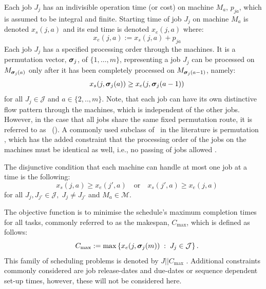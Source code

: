 \documentclass[twocolumn]{svjour3}
\begin{document}
Each job $J_j$ has an indivisible operation time (or cost) on machine $M_a$, 
$p_{ja}$, which is assumed to be integral and finite. 
Starting time of job $J_j$ on machine $M_a$ is denoted $x_s(j,a)$ and its 
end time is denoted $x_e(j,a)$ where:
\begin{equation}\quad x_e(j,a):=x_s(j,a)+p_{ja} \end{equation} 
Each job $J_j$ has a specified processing order through the machines. It is a 
permutation vector, $\bm \sigma_j$, of $\{1,\ldots,m\}$, representing a job $J_j$ 
can be processed on $M_{\bm \sigma_j(a)}$ only after it has been completely 
processed on $M_{\bm \sigma_j(a-1)}$, namely:
\begin{equation}\quad\label{eq:permutation}
x_s(j,\bm \sigma_j(a)) \geq x_e(j,\bm \sigma_j(a-1)) 
\end{equation}
for all $J_j\in\mathcal{J}$ and $a\in\{2,..,m\}$. 
Note, that each job can have its own distinctive flow pattern through the 
machines, which is independent of the other jobs. 
However, in the case that all jobs share the same fixed permutation 
route, it is referred to as \fsp~(\FSP). 
A commonly used subclass of \FSP\ in the literature is permutation \fsp, which 
has the added constraint that the processing order of the jobs on the machines 
must be identical as well, i.e., no passing of jobs allowed \cite{Stafford88}.

The disjunctive condition that each machine can handle at most one job at a 
time is the following:
\begin{equation}\quad\label{eq:oneJobPerMac}
x_s(j,a) \geq x_e(j',a) \quad\textrm{or}\quad x_s(j',a) \geq x_e(j,a) 
\end{equation}
for all $J_j,J_{j'}\in\mathcal{J},\; J_j\neq J_{j'}$ and $M_a\in\mathcal{M}$. 

The objective function is to minimise the schedule's maximum completion times 
for all tasks, commonly referred to as the makespan, $C_{\max}$, which is 
defined as follows:
\begin{equation}\quad
C_{\max} := 
\max\left\{x_e(j,\bm \sigma_j(m))\;:\;J_j\in\mathcal{J}\right\}.\label{eq:makespan}
\end{equation} 
This family of scheduling problems is denoted by $J||C_{\max}$ 
\cite{Pinedo08}.
Additional constraints commonly considered are job release-dates and due-dates 
or sequence dependent set-up times, however, these will not be considered here. 
\end{document}
